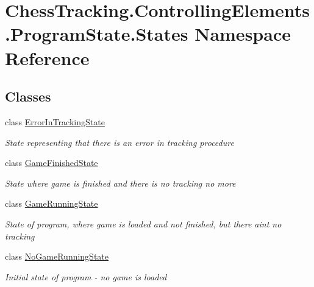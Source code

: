 \hypertarget{namespace_chess_tracking_1_1_controlling_elements_1_1_program_state_1_1_states}{}\section{Chess\+Tracking.\+Controlling\+Elements.\+Program\+State.\+States Namespace Reference}
\label{namespace_chess_tracking_1_1_controlling_elements_1_1_program_state_1_1_states}
\subsection*{Classes}
\begin{DoxyCompactItemize}
\item 
class \mbox{\hyperlink{class_chess_tracking_1_1_controlling_elements_1_1_program_state_1_1_states_1_1_error_in_tracking_state}{Error\+In\+Tracking\+State}}
\begin{DoxyCompactList}\small\item\em State representing that there is an error in tracking procedure \end{DoxyCompactList}\item 
class \mbox{\hyperlink{class_chess_tracking_1_1_controlling_elements_1_1_program_state_1_1_states_1_1_game_finished_state}{Game\+Finished\+State}}
\begin{DoxyCompactList}\small\item\em State where game is finished and there is no tracking no more \end{DoxyCompactList}\item 
class \mbox{\hyperlink{class_chess_tracking_1_1_controlling_elements_1_1_program_state_1_1_states_1_1_game_running_state}{Game\+Running\+State}}
\begin{DoxyCompactList}\small\item\em State of program, where game is loaded and not finished, but there ain\textquotesingle{}t no tracking \end{DoxyCompactList}\item 
class \mbox{\hyperlink{class_chess_tracking_1_1_controlling_elements_1_1_program_state_1_1_states_1_1_no_game_running_state}{No\+Game\+Running\+State}}
\begin{DoxyCompactList}\small\item\em Initial state of program -\/ no game is loaded \end{DoxyCompactList}\item 

\end{DoxyCompactItemize}
